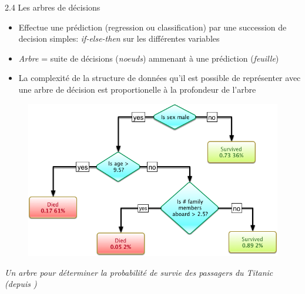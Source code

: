 \begin{frame}{2.4 Les arbres de décisions}
  \begin{itemize}
  \item Effectue une prédiction (regression ou classification) par une succession de decision simples: \textit{if-else-then} sur les différentes variables
  \item \textit{Arbre} = suite de décisions (\textit{noeuds}) ammenant à une prédiction (\textit{feuille})
  \end{itemize}
  \begin{minipage}{.45\textwidth}
    \begin{itemize}
    \item La complexité de la structure de données qu'il est possible de représenter avec une arbre de décision est proportionelle à la profondeur de l'arbre
    \end{itemize}
  \end{minipage}
  \begin{minipage}{.54\textwidth}
    \begin{figure}
      \includegraphics[width=.9\textwidth]{fig/decisionTreeExample.png}
    \end{figure}
    \begin{center}
      \scriptsize
      \textit{Un arbre pour déterminer la probabilité de survie des passagers du Titanic (depuis \href{https://en.wikipedia.org/wiki/Decision_tree_learning}{\color{blue}{Wikipedia}})}
    \end{center}
  \end{minipage}
\end{frame}

